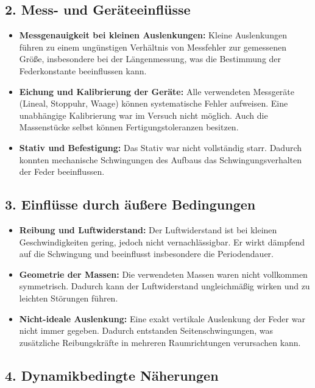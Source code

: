 \subsection*{2. Mess- und Geräteeinflüsse}

\begin{itemize}
    \item \textbf{Messgenauigkeit bei kleinen Auslenkungen:} Kleine Auslenkungen führen zu einem ungünstigen Verhältnis von Messfehler zur gemessenen Größe, insbesondere bei der Längenmessung, was die Bestimmung der Federkonstante beeinflussen kann.
    
    \item \textbf{Eichung und Kalibrierung der Geräte:} Alle verwendeten Messgeräte (Lineal, Stoppuhr, Waage) können systematische Fehler aufweisen. Eine unabhängige Kalibrierung war im Versuch nicht möglich. Auch die Massenstücke selbst können Fertigungstoleranzen besitzen.
    
    \item \textbf{Stativ und Befestigung:} Das Stativ war nicht vollständig starr. Dadurch konnten mechanische Schwingungen des Aufbaus das Schwingungsverhalten der Feder beeinflussen.
\end{itemize}

\subsection*{3. Einflüsse durch äußere Bedingungen}

\begin{itemize}
    \item \textbf{Reibung und Luftwiderstand:} Der Luftwiderstand ist bei kleinen Geschwindigkeiten gering, jedoch nicht vernachlässigbar. Er wirkt dämpfend auf die Schwingung und beeinflusst insbesondere die Periodendauer.
    
    \item \textbf{Geometrie der Massen:} Die verwendeten Massen waren nicht vollkommen symmetrisch. Dadurch kann der Luftwiderstand ungleichmäßig wirken und zu leichten Störungen führen.
    
    \item \textbf{Nicht-ideale Auslenkung:} Eine exakt vertikale Auslenkung der Feder war nicht immer gegeben. Dadurch entstanden Seitenschwingungen, was zusätzliche Reibungskräfte in mehreren Raumrichtungen verursachen kann.
\end{itemize}

\subsection*{4. Dynamikbedingte Näherungen}

